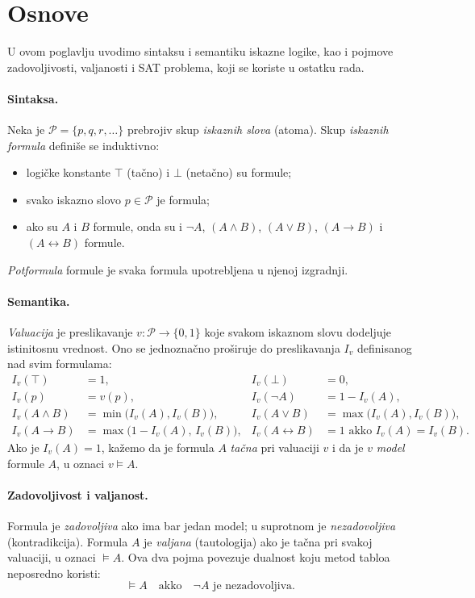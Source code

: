 \documentclass[a4paper,10pt]{article}
\begin{document}
\section{Osnove}
\label{sec:osnove}

U ovom poglavlju uvodimo sintaksu i semantiku iskazne logike, kao i pojmove
zadovoljivosti, valjanosti i SAT problema, koji se koriste u ostatku rada.

\paragraph{Sintaksa.}
Neka je $\mathcal{P} = \{p, q, r, \dots\}$ prebrojiv skup \emph{iskaznih slova}
(atoma). Skup \emph{iskaznih formula} definiše se induktivno:
\begin{itemize}
 \item logičke konstante $\top$ (tačno) i $\bot$ (netačno) su formule;
 \item svako iskazno slovo $p \in \mathcal{P}$ je formula;
 \item ako su $A$ i $B$ formule, onda su i $\neg A$, $(A \wedge B)$,
       $(A \vee B)$, $(A \rightarrow B)$ i $(A \leftrightarrow B)$ formule.
\end{itemize}
\emph{Potformula} formule je svaka formula upotrebljena u njenoj izgradnji.

\paragraph{Semantika.}
\emph{Valuacija} je preslikavanje $v : \mathcal{P} \to \{0,1\}$ koje svakom
iskaznom slovu dodeljuje istinitosnu vrednost. Ono se jednoznačno proširuje do
preslikavanja $I_v$ definisanog nad svim formulama:
\begin{align*}
 I_v(\top) &= 1, & I_v(\bot) &= 0, \\
 I_v(p) &= v(p), & I_v(\neg A) &= 1 - I_v(A), \\
 I_v(A \wedge B) &= \min\big(I_v(A), I_v(B)\big), &
 I_v(A \vee B) &= \max\big(I_v(A), I_v(B)\big), \\
 I_v(A \rightarrow B) &= \max\big(1 - I_v(A),\, I_v(B)\big), &
 I_v(A \leftrightarrow B) &= 1 \text{ akko } I_v(A) = I_v(B).
\end{align*}
Ako je $I_v(A) = 1$, kažemo da je formula $A$ \emph{tačna} pri valuaciji $v$ i
da je $v$ \emph{model} formule $A$, u oznaci $v \models A$.

\paragraph{Zadovoljivost i valjanost.}
Formula je \emph{zadovoljiva} ako ima bar jedan model; u suprotnom je
\emph{nezadovoljiva} (kontradikcija). Formula $A$ je \emph{valjana}
(tautologija) ako je tačna pri svakoj valuaciji, u oznaci $\models A$. Ova dva
pojma povezuje dualnost koju metod tabloa neposredno koristi:
\begin{equation}
 \label{eq:dualnost}
 {\models} A \quad \text{akko} \quad \neg A \text{ je nezadovoljiva}.
\end{equation}
\end{document}
